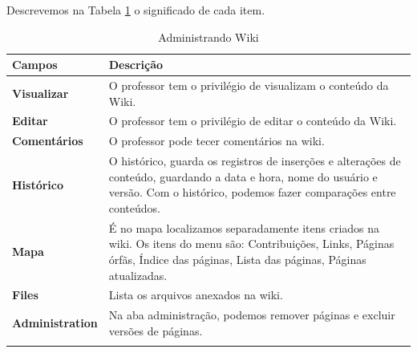Descrevemos na Tabela \ref{tab:wiki} o significado de cada item.
\begin{longtable}{p{6cm}|p{9cm}}
     \hline
     \rowcolor[rgb]{0.8,0.8,0.8} \textbf{Campos} &  \textbf{Descrição}\\\hline
    \textbf{Visualizar} &O professor tem o privilégio de visualizam o conteúdo da Wiki. \\\hline
    \textbf{Editar} & O professor tem o privilégio de editar o conteúdo da Wiki.\\\hline
    \textbf{Comentários } & O professor pode tecer comentários na wiki. \\\hline
    \textbf{Histórico} & O histórico, guarda os registros de inserções e alterações de conteúdo, guardando a data e hora, nome do usuário e versão.
Com o histórico, podemos fazer comparações entre conteúdos.
 \\\hline
    \textbf{Mapa} & É no mapa localizamos separadamente itens criados na wiki. Os itens do menu são: Contribuições, Links, Páginas órfãs, Índice das páginas, Lista das páginas, Páginas atualizadas. \\\hline
    \textbf{Files} & Lista os arquivos anexados na wiki.\\\hline
    \textbf{Administration} &Na aba administração, podemos remover páginas e excluir versões de páginas. \\\hline
\caption{Administrando Wiki}
\label{tab:wiki}
\end{longtable}%

